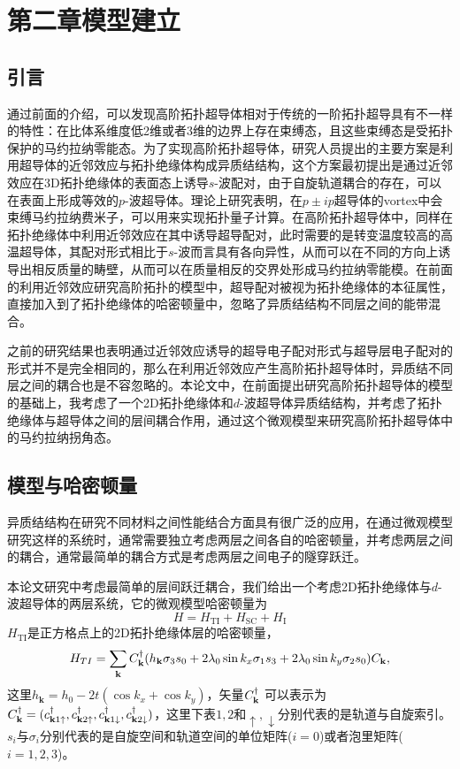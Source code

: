 \section{第二章\quad 模型建立}
\subsection{引言}
\qquad 通过前面的介绍，可以发现高阶拓扑超导体相对于传统的一阶拓扑超导具有不一样的特性：在比体系维度低2维或者3维的边界上存在束缚态，且这些束缚态是受拓扑保护的马约拉纳零能态。为了实现高阶拓扑超导体，研究人员提出的主要方案是利用超导体的近邻效应与拓扑绝缘体构成异质结结构，这个方案最初提出是通过近邻效应在3D拓扑绝缘体的表面态上诱导$s$-波配对，由于自旋轨道耦合的存在，可以在表面上形成等效的$p$-波超导体。理论上研究表明，在$p\pm ip$超导体的vortex中会束缚马约拉纳费米子，可以用来实现拓扑量子计算。在高阶拓扑超导体中，同样在拓扑绝缘体中利用近邻效应在其中诱导超导配对，此时需要的是转变温度较高的高温超导体，其配对形式相比于$s$-波而言具有各向异性，从而可以在不同的方向上诱导出相反质量的畴壁，从而可以在质量相反的交界处形成马约拉纳零能模。在前面的利用近邻效应研究高阶拓扑的模型中，超导配对被视为拓扑绝缘体的本征属性，直接加入到了拓扑绝缘体的哈密顿量中，忽略了异质结结构不同层之间的能带混合。

\qquad 之前的研究结果也表明通过近邻效应诱导的超导电子配对形式与超导层电子配对的形式并不是完全相同的\cite{re48,re49}，那么在利用近邻效应产生高阶拓扑超导体时，异质结不同层之间的耦合也是不容忽略的。本论文中，在前面提出研究高阶拓扑超导体的模型\cite{re27,re28,re29}的基础上，我考虑了一个2D拓扑绝缘体和$d$-波超导体异质结结构，并考虑了拓扑绝缘体与超导体之间的层间耦合作用，通过这个微观模型来研究高阶拓扑超导体中的马约拉纳拐角态。
\subsection{模型与哈密顿量}
\qquad 异质结结构在研究不同材料之间性能结合方面具有很广泛的应用，在通过微观模型研究这样的系统时，通常需要独立考虑两层之间各自的哈密顿量，并考虑两层之间的耦合，通常最简单的耦合方式是考虑两层之间电子的隧穿跃迁。

\qquad 本论文研究中考虑最简单的层间跃迁耦合，我们给出一个考虑2D拓扑绝缘体与$d$-波超导体的两层系统，它的微观模型哈密顿量为
\begin{equation}
H=H_\mathrm{TI}+H_\mathrm{SC}+H_\mathrm{I}
\end{equation}
$H_\mathrm{TI}$是正方格点上的2D拓扑绝缘体层的哈密顿量\cite{re56,re57}，
\begin{equation}
\begin{aligned}
H_{TI} =\sum_{{\bf k}}C_{{\bf k}}^\dagger (h_\mathbf{k}\sigma_3s_0+2\lambda_{0}\sin k_x\sigma_1s_3+2\lambda_0\sin k_y\sigma_2 s_0)C_{{\bf k}},
\end{aligned}
\end{equation}
这里$h_\mathbf{k}=h_0-2t(\cos k_x+\cos k_y)$，矢量$C^\dagger_{\bf k}$ 可以表示为$C^\dagger_{\bf k}=(c^\dagger_{{\bf k}1\uparrow},c^\dagger_{{\bf k}2\uparrow},c^\dagger_{{\bf k}1\downarrow},c^\dagger_{{\bf k}2\downarrow})$，这里下表$1,2$和$\uparrow,\downarrow$分别代表的是轨道与自旋索引。$s_i$与$\sigma_i$分别代表的是自旋空间和轨道空间的单位矩阵($i=0$)或者泡里矩阵($i=1,2,3$)。

